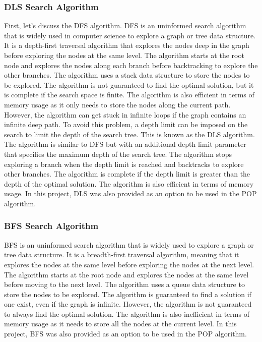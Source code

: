 \subsubsection{\acf{DLS} Search Algorithm} \label{subsubsec:dls}
First, let's discuss the \ac{DFS} algorithm.
\ac{DFS} is an uninformed search algorithm that is widely used in computer science to explore a graph or tree data structure. It is a depth-first traversal algorithm that explores the nodes deep in the graph before exploring the nodes at the same level. The algorithm starts at the root node and explores the nodes along each branch before backtracking to explore the other branches. The algorithm uses a stack data structure to store the nodes to be explored. The algorithm is not guaranteed to find the optimal solution, but it is complete if the search space is finite. The algorithm is also efficient in terms of memory usage as it only needs to store the nodes along the current path. However, the algorithm can get stuck in infinite loops if the graph contains an infinite deep path. To avoid this problem, a depth limit can be imposed on the search to limit the depth of the search tree. This is known as the \acf{DLS} algorithm. The algorithm is similar to \ac{DFS} but with an additional depth limit parameter that specifies the maximum depth of the search tree. The algorithm stops exploring a branch when the depth limit is reached and backtracks to explore other branches. The algorithm is complete if the depth limit is greater than the depth of the optimal solution. The algorithm is also efficient in terms of memory usage. In this project, \ac{DLS} was also provided as an option to be used in the \ac{POP} algorithm.

\subsubsection{\acf{BFS} Search Algorithm} \label{subsubsec:bfs}
\ac{BFS} is an uninformed search algorithm that is widely used to explore a graph or tree data structure. It is a breadth-first traversal algorithm, meaning that it explores the nodes at the same level before exploring the nodes at the next level. The algorithm starts at the root node and explores the nodes at the same level before moving to the next level. The algorithm uses a queue data structure to store the nodes to be explored. The algorithm is guaranteed to find a solution if one exist, even if the graph is infinite. However, the algorithm is not guaranteed to always find the optimal solution. The algorithm is also inefficient in terms of memory usage as it needs to store all the nodes at the current level. In this project, \ac{BFS} was also provided as an option to be used in the \ac{POP} algorithm.

